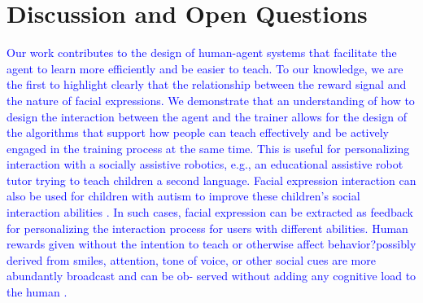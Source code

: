 
\section{Discussion and Open Questions}
\label{sec:doq}



\textcolor{blue}{Our work contributes to the design of human-agent systems that facilitate the agent to learn more efficiently and be easier to teach. To our knowledge, we are the first to highlight clearly that the relationship between the reward signal and the nature of facial expressions. %
We demonstrate that an understanding of how to design the interaction between the agent and the trainer allows for the design of the algorithms that support how people can teach effectively and be actively engaged in the training process at the same time. This is useful for personalizing interaction with a socially assistive robotics, e.g., an educational assistive robot tutor \cite{gordon2016affective} trying to teach children a second language. Facial expression interaction can also be used for children with autism to improve these children's social interaction abilities \cite{pour2018human}. In such cases, facial expression can be extracted as feedback for personalizing the interaction process for users with different abilities. Human rewards given without the intention to teach or otherwise affect behavior?possibly derived from smiles, attention, tone of voice, or other social cues are more abundantly broadcast and can be ob- served without adding any cognitive load to the human \cite{knox2012learning}.} 

